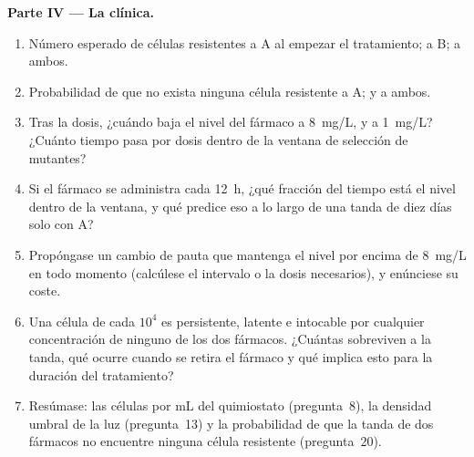 \begin{problem}
\medskip
\noindent\textbf{Parte IV --- La clínica.}
\begin{enumerate}[resume]
  \item Número esperado de células resistentes a A al empezar el
        tratamiento; a B; a ambos.
  \item Probabilidad de que no exista ninguna célula resistente a A; y a
        ambos.
  \item Tras la dosis, ¿cuándo baja el nivel del fármaco a
        \qty{8}{mg/L}, y a \qty{1}{mg/L}? ¿Cuánto tiempo pasa por dosis
        dentro de la ventana de selección de mutantes?
  \item Si el fármaco se administra cada \qty{12}{h}, ¿qué fracción del
        tiempo está el nivel dentro de la ventana, y qué predice eso a lo
        largo de una tanda de diez días solo con A?
  \item Propóngase un cambio de pauta que mantenga el nivel por encima de
        \qty{8}{mg/L} en todo momento (calcúlese el intervalo o la dosis
        necesarios), y enúnciese su coste.
  \item Una célula de cada $10^{4}$ es persistente, latente e intocable
        por cualquier concentración de ninguno de los dos fármacos.
        ¿Cuántas sobreviven a la tanda, qué ocurre cuando se retira el
        fármaco y qué implica esto para la duración del tratamiento?
  \item Resúmase: las células por mL del quimiostato (pregunta~8), la
        densidad umbral de la luz (pregunta~13) y la probabilidad de que
        la tanda de dos fármacos no encuentre ninguna célula resistente
        (pregunta~20).
\end{enumerate}
\end{problem}
